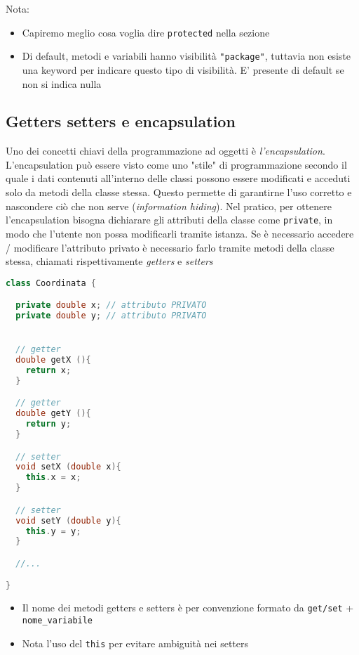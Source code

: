 Nota:
\begin{itemize}
	\item Capiremo meglio cosa voglia dire \verb|protected| nella sezione
	\item Di default, metodi e variabili hanno visibilità \verb|"package"|, tuttavia non esiste una keyword per indicare questo tipo di visibilità. E' presente di default se non si indica nulla
\end{itemize}

\subsection{Getters setters e encapsulation}
Uno dei concetti chiavi della programmazione ad oggetti è \textit{l'encapsulation}. L'encapsulation può essere visto come uno "stile" di programmazione secondo il quale i dati contenuti all'interno delle classi possono essere modificati e acceduti solo da metodi della classe stessa. Questo permette di garantirne l'uso corretto e nascondere ciò che non serve (\textit{information hiding}).
\vskip3mm
Nel pratico, per ottenere l'encapsulation bisogna dichiarare gli attributi della classe come \verb|private|, in modo che l'utente non possa modificarli tramite istanza.
\vskip3mm
Se è necessario accedere / modificare l'attributo privato è necessario farlo tramite metodi della classe stessa, chiamati rispettivamente \textit{getters} e \textit{setters}
\vskip3mm
\begin{lstlisting}[language = c++, frame = none]
class Coordinata {

  private double x; // attributo PRIVATO
  private double y; // attributo PRIVATO


  // getter
  double getX (){
    return x;
  }

  // getter
  double getY (){
    return y;
  }

  // setter
  void setX (double x){
    this.x = x;
  }

  // setter
  void setY (double y){
    this.y = y;
  }

  //...

}
\end{lstlisting}
\vskip3mm

\begin{itemize}
	\item Il nome dei metodi getters e setters è per convenzione formato da \verb|get/set| + \verb|nome_variabile|
	\item Nota l'uso del \verb|this| per evitare ambiguità nei setters
\end{itemize}

